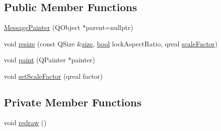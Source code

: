 \subsection*{Public Member Functions}
\begin{DoxyCompactItemize}
\item 
\mbox{\hyperlink{class_q_g_b_a_1_1_message_painter_a17d9cc1af0b1c6ffe65f0ff91d15a39b}{Message\+Painter}} (Q\+Object $\ast$parent=nullptr)
\item 
void \mbox{\hyperlink{class_q_g_b_a_1_1_message_painter_aa5b77ba11d3fb71e85765c279944495c}{resize}} (const Q\+Size \&\mbox{\hyperlink{ioapi_8h_a014d89bd76f74ef3a29c8f04b473eb76}{size}}, \mbox{\hyperlink{libretro_8h_a4a26dcae73fb7e1528214a068aca317e}{bool}} lock\+Aspect\+Ratio, qreal \mbox{\hyperlink{wii_2main_8c_abf473eae6494d40ce12c72a39f0ca41d}{scale\+Factor}})
\item 
void \mbox{\hyperlink{class_q_g_b_a_1_1_message_painter_a2c8a4b2a2935f3d1033260768aa36796}{paint}} (Q\+Painter $\ast$painter)
\item 
void \mbox{\hyperlink{class_q_g_b_a_1_1_message_painter_ae3c9b2709da7fdb9467c170da17bea26}{set\+Scale\+Factor}} (qreal factor)
\end{DoxyCompactItemize}
\subsection*{Private Member Functions}
\begin{DoxyCompactItemize}
\item 
void \mbox{\hyperlink{class_q_g_b_a_1_1_message_painter_ad6d1f2533c2e7bd5afa17814044adc8d}{redraw}} ()
\end{DoxyCompactItemize}
